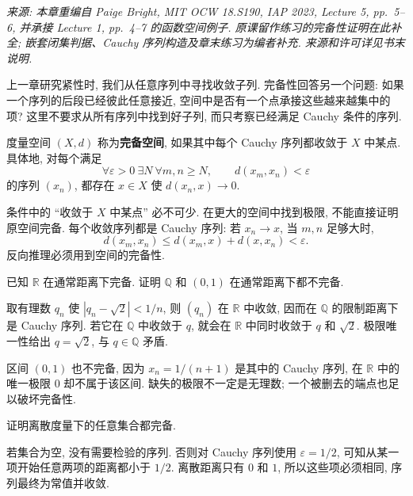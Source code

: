 \label{ch:complete}

\emph{来源: 本章重编自 Paige Bright, MIT OCW 18.S190, IAP 2023, Lecture 5, pp.\ 5--6, 并承接 Lecture 1, pp.\ 4--7 的函数空间例子. 原课留作练习的完备性证明在此补全; 嵌套闭集判据、Cauchy 序列构造及章末练习为编者补充. 来源和许可详见书末说明.}


上一章研究紧性时, 我们从任意序列中寻找收敛子列. 完备性回答另一个问题: 如果一个序列的后段已经彼此任意接近, 空间中是否有一个点承接这些越来越集中的项? 这里不要求从所有序列中找到好子列, 而只考察已经满足 Cauchy 条件的序列.

\begin{definition}\label{def:complete}
度量空间 $(X,d)$ 称为\textbf{完备空间}, 如果其中每个 Cauchy 序列都收敛于 $X$ 中某点. 具体地, 对每个满足
\[
\forall\varepsilon>0\ \exists N\ \forall m,n\geq N,
\qquad d(x_m,x_n)<\varepsilon
\]
的序列 $(x_n)$, 都存在 $x\in X$ 使 $d(x_n,x)\to0$.
\end{definition}

条件中的 ``收敛于 $X$ 中某点'' 必不可少. 在更大的空间中找到极限, 不能直接证明原空间完备. 每个收敛序列都是 Cauchy 序列: 若 $x_n\to x$, 当 $m,n$ 足够大时,
\[
d(x_m,x_n)\leq d(x_m,x)+d(x,x_n)<\varepsilon.
\]
反向推理必须用到空间的完备性.

\begin{example}
已知 $\mathbb R$ 在通常距离下完备. 证明 $\mathbb Q$ 和 $(0,1)$ 在通常距离下都不完备.
\end{example}
\begin{solution}
取有理数 $q_n$ 使 $|q_n-\sqrt2|<1/n$, 则 $(q_n)$ 在 $\mathbb R$ 中收敛, 因而在 $\mathbb Q$ 的限制距离下是 Cauchy 序列. 若它在 $\mathbb Q$ 中收敛于 $q$, 就会在 $\mathbb R$ 中同时收敛于 $q$ 和 $\sqrt2$. 极限唯一性给出 $q=\sqrt2$, 与 $q\in\mathbb Q$ 矛盾.

区间 $(0,1)$ 也不完备, 因为 $x_n=1/(n+1)$ 是其中的 Cauchy 序列, 在 $\mathbb R$ 中的唯一极限 $0$ 却不属于该区间. 缺失的极限不一定是无理数; 一个被删去的端点也足以破坏完备性.
\end{solution}

\begin{example}
证明离散度量下的任意集合都完备.
\end{example}
\begin{solution}
若集合为空, 没有需要检验的序列. 否则对 Cauchy 序列使用 $\varepsilon=1/2$, 可知从某一项开始任意两项的距离都小于 $1/2$. 离散距离只有 $0$ 和 $1$, 所以这些项必须相同, 序列最终为常值并收敛.
\end{solution}

